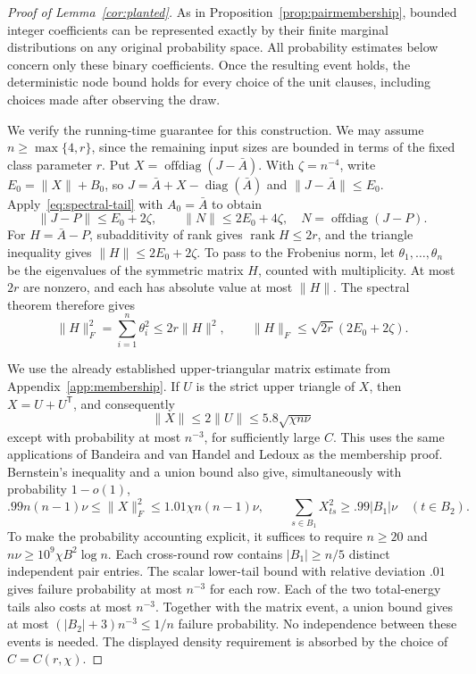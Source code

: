 \documentclass[11pt,a4paper]{article}
\theoremstyle{definition}
\theoremstyle{remark}
\DeclareMathOperator{\rank}{rank}
\begin{document}
\begin{proof}[Proof of Lemma~\ref{cor:planted}]
As in Proposition~\ref{prop:pairmembership}, bounded integer coefficients
can be represented exactly by their finite marginal distributions on any
original probability space. All probability estimates below concern only
these binary coefficients. Once the resulting event holds, the deterministic
node bound holds for every choice of the unit clauses, including choices
made after observing the draw.

We verify the running-time guarantee for this construction. We may assume
$n\ge\max\{4,r\}$, since the remaining input sizes are bounded in terms
of the fixed class parameter $r$.
Put $X=\operatorname{offdiag}(J-\bar A)$. With $\zeta=n^{-4}$, write
$E_0=\|X\|+B_0$, so $J=\bar A+X-\operatorname{diag}(\bar A)$ and
$\|J-\bar A\|\le E_0$. Apply~\eqref{eq:spectral-tail} with
$A_0=\bar A$ to obtain
\[
 \|J-P\|\le E_0+2\zeta,\qquad
 \|N\|\le2E_0+4\zeta,
 \quad N=\operatorname{offdiag}(J-P).
\]
For $H=\bar A-P$, subadditivity of rank gives $\rank H\le2r$,
and the triangle inequality gives $\|H\|\le2E_0+2\zeta$.
To pass to the Frobenius norm, let $\theta_1,\ldots,\theta_n$ be the
eigenvalues of the symmetric matrix $H$, counted with multiplicity.
At most $2r$ are nonzero, and each has absolute value at most $\|H\|$.
The spectral theorem therefore gives
\[
 \|H\|_F^2=\sum_{i=1}^n\theta_i^2\le2r\|H\|^2,
 \qquad
 \|H\|_F\le\sqrt{2r}(2E_0+2\zeta).
\]

We use the already established upper-triangular matrix estimate from
Appendix~\ref{app:membership}. If $U$ is the strict upper triangle of
$X$, then $X=U+U^{\mathsf T}$, and consequently
\[
 \|X\|\le2\|U\|\le5.8\sqrt{\chi n\nu}
\]
except with probability at most $n^{-3}$, for sufficiently large $C$.
This uses the same applications of Bandeira and van Handel and Ledoux
as the membership proof. Bernstein's inequality and a union bound also
give, simultaneously with probability $1-o(1)$,
\[
 .99n(n-1)\nu\le\|X\|_F^2\le1.01\chi n(n-1)\nu,
 \qquad
 \sum_{s\in B_1}X_{ts}^2\ge.99|B_1|\nu\quad(t\in B_2).
\]
To make the probability accounting explicit, it suffices to require
$n\ge20$ and $n\nu\ge10^9\chi B^2\log n$. Each cross-round row
contains $|B_1|\ge n/5$ distinct independent pair entries. The scalar
lower-tail bound with relative deviation $.01$ gives failure probability
at most $n^{-3}$ for each row. Each of the two total-energy tails also
costs at most $n^{-3}$. Together with the matrix event, a union bound gives
at most $(|B_2|+3)n^{-3}\le1/n$ failure probability. No independence
between these events is needed. The displayed density requirement is
absorbed by the choice of $C=C(r,\chi)$.


\end{proof}
\end{document}
